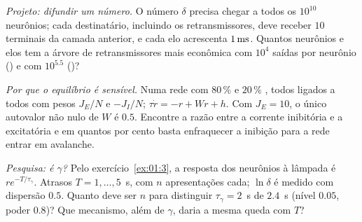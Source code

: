 \begin{exercise}[\lvlB]
\label{ex:01:5}
\emph{Projeto: difundir um número.} O número $\delta$ precisa chegar a todos os $10^{10}$ neurônios; cada destinatário, incluindo os retransmissores, deve receber $10$ terminais da camada anterior, e cada elo acrescenta $1\,\text{ms}$. Quantos neurônios e elos tem a árvore de retransmissores mais econômica com $10^4$ saídas por neurônio () e com $10^{5.5}$ ()?
\end{exercise}

\begin{exercise}[\lvlB]
\label{ex:01:6}
\emph{Por que o equilíbrio é sensível.} Numa rede com $80\,\%$  e $20\,\%$ , todos ligados a todos com pesos $J_E/N$ e $-J_I/N$; $\tau\dot r=-r+Wr+h$. Com $J_E=10$, o único autovalor não nulo de $W$ é $0.5$. Encontre a razão entre a corrente inibitória e a excitatória e em quantos por cento basta enfraquecer a inibição para a rede entrar em avalanche.
\end{exercise}

\begin{exercise}[\lvlC]
\label{ex:01:7}
\emph{Pesquisa:  é $\gamma$?} Pelo exercício~\ref{ex:01:3}, a resposta dos neurônios  à lâmpada é $re^{-T/\tau_\gamma}$. Atrasos $T=1,\dots,5$~s, com $n$ apresentações cada; $\ln\delta$ é medido com dispersão $0.5$. Quanto deve ser $n$ para distinguir $\tau_\gamma=2$~s de $2.4$~s (nível $0.05$, poder $0.8$)? Que mecanismo, além de $\gamma$, daria a mesma queda com $T$?
\end{exercise}
